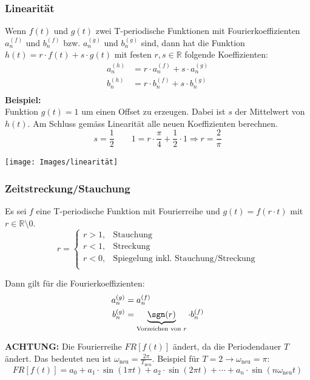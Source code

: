 \subsubsection{Linearität}
Wenn $f(t)$ und $g(t)$ zwei T-periodische Funktionen mit Fourierkoeffizienten $a_n^{(f)}$ und $b_n^{(f)}$ bzw.  $a_n^{(g)}$ und $b_n^{(g)}$ sind, dann hat die Funktion $h(t) = r \cdot f(t) + s \cdot g(t)$ mit festen $r,s \in \mathbb{R}$ folgende Koeffizienten:
\begin{align*}
	a_n^{(h)} &= r \cdot a_n^{(f)} + s \cdot a_n^{(g)} \\
	b_n^{(h)} &= r \cdot b_n^{(f)} + s \cdot b_n^{(g)} \\
\end{align*}
\noindent\textbf{Beispiel:}~\\
\noindent Funktion $g(t) = 1$ um einen Offset zu erzeugen. Dabei ist $s$ der Mittelwert von $h(t)$. Am Schluss gemäss Linearität alle neuen Koeffizienten berechnen.
\[
	s = \frac{1}{2} \qquad
	1 = r\cdot \frac{\pi}{4} + \frac{1}{2} \cdot 1 \Rightarrow r = \frac{2}{\pi}
\]
\begin{center}
	\texttt{[image: Images/linearität]}
\end{center}

\subsubsection{Zeitstreckung/Stauchung}
Es sei $f$ eine T-periodische Funktion mit Fourierreihe und $g(t) = f(r \cdot t)$ mit $r \in \mathbb{R}\setminus0$.
\[
r = \begin{cases}
		r > 1, & \text{Stauchung}\\
		r < 1, & \text{Streckung}\\
		r < 0, & \text{Spiegelung inkl. Stauchung/Streckung}\\
	\end{cases}
\]

\noindent Dann gilt für die Fourierkoeffizienten:
\begin{align*}
	a_n^{(g)} &= a_n^{(f)} \\
	b_n^{(g)} &= \underbrace{\sgn(r)}_{\text{Vorzeichen von } r} \cdot b_n^{(f)} \\
\end{align*}

\noindent\textbf{ACHTUNG:} Die Fourierreihe $FR[f(t)]$ ändert, da die Periodendauer $T$ ändert. Das bedeutet neu ist $\omega_{\text{neu}} = \frac{2\pi}{T_{\text{neu}}}$. Beispiel für $T = 2 \rightarrow \omega_{\text{neu}} = \pi$:
\[
FR[f(t)] = a_0 + a_1\cdot\sin(1\pi t) + a_2\cdot\sin(2\pi t) + \cdots + a_n\cdot\sin(n\omega_{\text{neu}} t)
\]

